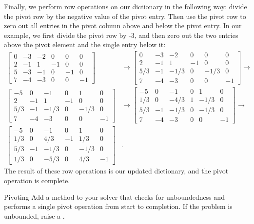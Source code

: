 Finally, we perform row operations on our dictionary in the following way: divide the pivot row by the negative value of the pivot entry.
Then use the pivot row to zero out all entries in the pivot column above and below the pivot entry.
In our example, we first divide the pivot row by -3, and then zero out the two entries above the pivot element and the single entry below it:
\begin{align*}
\begin{bmatrix}
    0 & -3 & -2 & 0 & 0 & 0\\
    2 & -1 & 1 & -1 & 0 & 0\\
    5 & -3 & -1 & 0 & -1 & 0\\
    7 & -4 & -3 & 0 & 0 & -1
    \end{bmatrix} &\rightarrow
\begin{bmatrix}
    0 & -3 & -2 & 0 & 0 & 0\\
    2 & -1 & 1 & -1 & 0 & 0\\
    5/3 & -1 & -1/3 & 0 & -1/3 & 0\\
    7 & -4 & -3 & 0 & 0 & -1
    \end{bmatrix}\rightarrow\\
\begin{bmatrix}
    -5 & 0 & -1 & 0 & 1 & 0\\
    2 & -1 & 1 & -1 & 0 & 0\\
    5/3 & -1 & -1/3 & 0 & -1/3 & 0\\
    7 & -4 & -3 & 0 & 0 & -1
    \end{bmatrix} &\rightarrow
\begin{bmatrix}
    -5 & 0 & -1 & 0 & 1 & 0\\
    1/3 & 0 & -4/3 & 1 & -1/3 & 0\\
    5/3 & -1 & -1/3 & 0 & -1/3 & 0\\
    7 & -4 & -3 & 0 & 0 & -1
    \end{bmatrix}\rightarrow\\
\begin{bmatrix}
    -5 & 0 & -1 & 0 & 1 & 0\\
    1/3 & 0 & 4/3 & -1 & 1/3 & 0\\
    5/3 & -1 & -1/3 & 0 & -1/3 & 0\\
    1/3 & 0 & -5/3 & 0 & 4/3 & -1
    \end{bmatrix}&.
\end{align*}
The result of these row operations is our updated dictionary, and the pivot operation is complete.

\begin{problem}{Pivoting}
Add a method to your solver that checks for unboundedness and performs a single pivot operation from start to completion.
If the problem is unbounded, raise a .
\end{problem}

